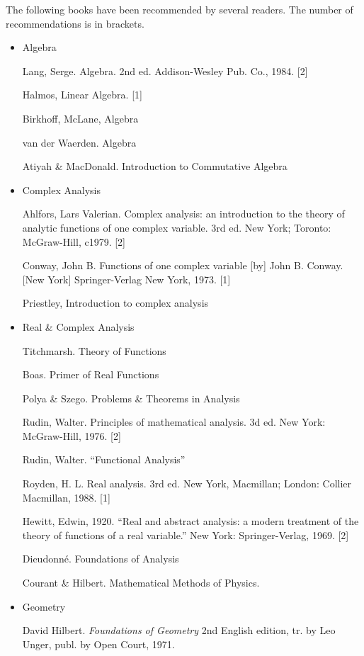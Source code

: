 The following books have been recommended by several readers.
The number of recommendations is in brackets.

\begin{itemize}
  \item Algebra

  Lang, Serge. Algebra. 2nd ed. Addison-Wesley Pub. Co., 1984. [2]

  Halmos, Linear Algebra. [1]

  Birkhoff, McLane, Algebra

  van der Waerden. Algebra

  Atiyah \& MacDonald. Introduction to Commutative Algebra

  \item Complex Analysis

  Ahlfors, Lars Valerian. Complex analysis: an introduction to the
  theory of analytic functions of one complex variable. 3rd ed. New
  York; Toronto: McGraw-Hill, c1979. [2]

  Conway, John B. Functions of one complex variable [by] John
  B. Conway. [New York] Springer-Verlag New York, 1973. [1]

  Priestley, Introduction to complex analysis

  \item Real \& Complex Analysis

  Titchmarsh. Theory of Functions

  Boas. Primer of Real Functions

  Polya \& Szego. Problems \& Theorems in Analysis

  Rudin, Walter. Principles of mathematical analysis. 3d ed. New York:
  McGraw-Hill, 1976. [2]

  Rudin, Walter. ``Functional Analysis''

  Royden, H. L. Real analysis. 3rd ed. New York, Macmillan; London:
  Collier Macmillan, 1988. [1]

  Hewitt, Edwin, 1920. ``Real and abstract analysis: a modern treatment
  of the theory of functions of a real variable.'' New York:
  Springer-Verlag, 1969. [2]

  Dieudonn\'e. Foundations of Analysis

  Courant \& Hilbert. Mathematical Methods of Physics.

  \item Geometry

  David Hilbert. {\em Foundations of Geometry} 2nd English edition,
  tr. by Leo Unger, publ. by Open Court, 1971.


\end{itemize}
